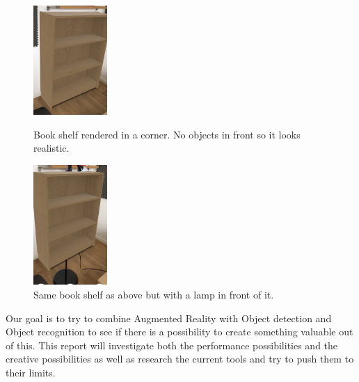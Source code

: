 \begin{figure}[hbtp]
\begin{center}
\includegraphics[width = 0.25\textwidth]{./Images/overlapping2.jpg} 
\caption{Book shelf rendered in a corner. No objects in front so it looks realistic.}
\includegraphics[width = 0.25\textwidth]{./Images/overlapping1.jpg} 
\caption{Same book shelf as above but with a lamp in front of it.}
\end{center}
\end{figure}

Our goal is to try to combine Augmented Reality with Object detection and Object recognition to see if there is a possibility to create something valuable out of this. This report will investigate both the performance possibilities and the creative possibilities as well as research the current tools and try to push them to their limits.


\newpage
